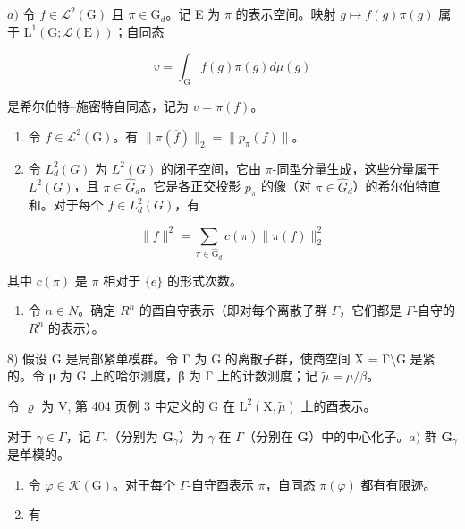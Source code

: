 \(a)\) 令 \(f \in \mathcal{L}^2(\mathrm{G})\) 且 \(\pi \in \widehat{\mathrm{G}}_d\)。记 E 为 \(\pi\) 的表示空间。映射 \(g \mapsto f(g)\pi(g)\) 属于 \(\mathrm{L}^1(\mathrm{G};\mathcal{L}(\mathrm{E}))\)；自同态

\[
v = \int_ {\mathrm{G}} f (g) \pi (g) d \mu (g)
\]

是希尔伯特–施密特自同态，记为 \(v = \pi(f)\)。

\begin{enumerate}
\def\labelenumi{\alph{enumi})}
\setcounter{enumi}{1}
\item
  令 \(f \in \mathcal{L}^2(\mathrm{G})\)。有 \(\| \pi(\overline{f}) \|_2 = \| p_\pi(f) \|\)。
\item
  令 \(L_{d}^{2}(G)\) 为 \(L^{2}(G)\) 的闭子空间，它由 \(\pi\)-同型分量生成，这些分量属于 \(L^{2}(G)\)，且 \(\pi \in \widehat{G}_{d}\)。它是各正交投影 \(p_{\pi}\) 的像（对 \(\pi \in \widehat{G}_{d}\)）的希尔伯特直和。对于每个 \(f \in L_{d}^{2}(G)\)，有
\end{enumerate}

\[
\| f \| ^ {2} = \sum_ {\pi \in \widehat {\mathrm{G}} _ {d}} c (\pi) \| \pi (f) \| _ {2} ^ {2}
\]

其中 \(c(\pi)\) 是 \(\pi\) 相对于 \(\{e\}\) 的形式次数。

\begin{enumerate}
\def\labelenumi{\arabic{enumi})}
\setcounter{enumi}{6}
\tightlist
\item
  令 \(n \in N\)。确定 \(R^{n}\) 的酉自守表示（即对每个离散子群 \(\Gamma\)，它们都是 \(\Gamma\)-自守的 \(R^{n}\) 的表示）。
\end{enumerate}

8) 假设 G 是局部紧单模群。令 Γ 为 G 的离散子群，使商空间 X = Γ\textbackslash G 是紧的。令 μ 为 G 上的哈尔测度，β 为 Γ 上的计数测度；记 \(\widetilde{\mu} = \mu/\beta\)。

令 \(\varrho\) 为 V, 第 404 页例 3 中定义的 G 在 \(\mathrm{L}^{2}(\mathrm{X},\widetilde{\mu})\) 上的酉表示。

对于 \(\gamma\in\Gamma\)，记 \(\Gamma_{\gamma}\)（分别为 \(\mathbf{G}_{\gamma}\)）为 \(\gamma\) 在 \(\Gamma\)（分别在 \(\mathbf{G}\)）中的中心化子。\(a)\) 群 \(\mathbf{G}_{\gamma}\) 是单模的。

\begin{enumerate}
\def\labelenumi{\alph{enumi})}
\setcounter{enumi}{1}
\item
  令 \(\varphi\in\mathcal{K}(\mathrm{G})\)。对于每个 \(\Gamma\)-自守酉表示 \(\pi\)，自同态 \(\pi(\varphi)\) 都有有限迹。
\item
  有
\end{enumerate}

